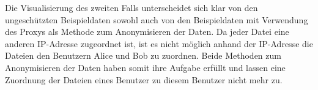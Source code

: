 \documentclass[
    fontsize=12pt,
    headings=small,
    parskip=half,           %
    bibliography=totoc,
    numbers=noenddot,       %
    open=any,               %
    ]{scrreprt}
\begin{document}
Die Visualisierung des zweiten Falls unterscheidet sich klar von den ungeschützten Beispieldaten sowohl auch von den Beispieldaten mit Verwendung des Proxys als Methode zum Anonymisieren der Daten. 
Da jeder Datei eine anderen IP-Adresse zugeordnet ist, ist es nicht möglich anhand der IP-Adresse die Dateien den Benutzern Alice und Bob zu zuordnen.
Beide Methoden zum Anonymisieren der Daten haben somit ihre Aufgabe erfüllt und lassen eine Zuordnung der Dateien eines Benutzer zu diesem Benutzer nicht mehr zu.

\end{document}

